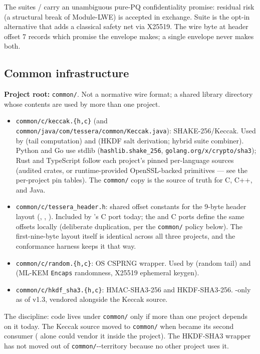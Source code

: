 The suites / carry an unambiguous pure-PQ confidentiality promise: residual risk (a structural break of Module-LWE) is accepted in exchange. Suite  is the opt-in alternative that adds a classical safety net via X25519. The wire byte at header offset 7 records which promise the envelope makes; a single envelope never makes both.

\subsection{Common infrastructure}

\textbf{Project root:} \texttt{common/}. Not a normative wire format; a shared library directory whose contents are used by more than one project.

\begin{itemize}
\item \texttt{common/c/keccak.\{h,c\}} (and \texttt{common/java/com/tessera/common/Keccak.java}): SHAKE-256/Keccak. Used by \tesserahash{} (tail computation) and \tesseraseal{} (HKDF salt derivation; hybrid suite combiner). Python and Go use stdlib (\texttt{hashlib.shake\_256}, \texttt{golang.org/x/crypto/sha3}); Rust and TypeScript follow each project's pinned per-language sources (audited crates, or runtime-provided OpenSSL-backed primitives --- see the per-project pin tables). The \texttt{common/} copy is the source of truth for C, C++, and Java.
\item \texttt{common/c/tessera\_header.h}: shared offset constants for the 9-byte header layout (, , ). Included by \tesseraseal{}'s C port today; the \tesseraid{} and \tesserahash{} C ports define the same offsets locally (deliberate duplication, per the \texttt{common/} policy below). The first-nine-byte layout itself is identical across all three projects, and the conformance harness keeps it that way.
\item \texttt{common/c/random.\{h,c\}}: OS CSPRNG wrapper. Used by \tesseraid{} (random tail) and \tesseraseal{} (ML-KEM \texttt{Encaps} randomness, X25519 ephemeral keygen).
\item \texttt{common/c/hkdf\_sha3.\{h,c\}}: HMAC-SHA3-256 and HKDF-SHA3-256. \tesseraseal{}-only as of v1.3, vendored alongside the Keccak source.
\end{itemize}

The discipline: code lives under \texttt{common/} only if more than one project depends on it today. The Keccak source moved to \texttt{common/} when \tesseraseal{} became its second consumer (\tesserahash{} alone could vendor it inside the project). The HKDF-SHA3 wrapper has not moved out of \texttt{common/}-\tesseraseal{}-territory because no other project uses it.
